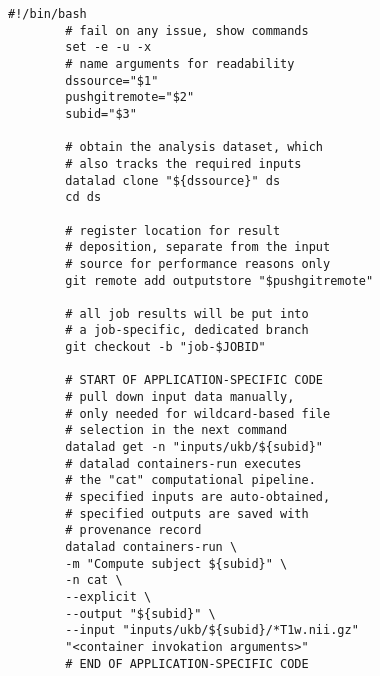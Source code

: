 \begin{Listing}
	\centering
	\begin{lstlisting}[multicols=2]
		#!/bin/bash
		# fail on any issue, show commands
		set -e -u -x
		# name arguments for readability
		dssource="$1"
		pushgitremote="$2"
		subid="$3"

		# obtain the analysis dataset, which
		# also tracks the required inputs
		datalad clone "${dssource}" ds
		cd ds

		# register location for result
		# deposition, separate from the input
		# source for performance reasons only
		git remote add outputstore "$pushgitremote"

		# all job results will be put into
		# a job-specific, dedicated branch
		git checkout -b "job-$JOBID"

		# START OF APPLICATION-SPECIFIC CODE
		# pull down input data manually,
		# only needed for wildcard-based file
		# selection in the next command
		datalad get -n "inputs/ukb/${subid}"
		# datalad containers-run executes
		# the "cat" computational pipeline.
		# specified inputs are auto-obtained,
		# specified outputs are saved with
		# provenance record
		datalad containers-run \
		-m "Compute subject ${subid}" \
		-n cat \
		--explicit \
		--output "${subid}" \
		--input "inputs/ukb/${subid}/*T1w.nii.gz"
		"<container invokation arguments>"
		# END OF APPLICATION-SPECIFIC CODE


\end{lstlisting}
\end{Listing}
